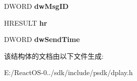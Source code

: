 \begin{DoxyCompactItemize}
\mbox{\label{struct_d_p_m_s_g___s_e_n_d_c_o_m_p_l_e_t_e_a252bc3eaf8a8cf646771c77aefa6409b}} 
D\+W\+O\+RD {\bfseries dw\+Msg\+ID}
\item 
\mbox{\label{struct_d_p_m_s_g___s_e_n_d_c_o_m_p_l_e_t_e_ab48fa50937446b214cd0e41ec237008c}} 
H\+R\+E\+S\+U\+LT {\bfseries hr}
\item 
\mbox{\label{struct_d_p_m_s_g___s_e_n_d_c_o_m_p_l_e_t_e_aeeae925b87fd9d2026eaee60bfdde9c0}} 
D\+W\+O\+RD {\bfseries dw\+Send\+Time}
\end{DoxyCompactItemize}


该结构体的文档由以下文件生成\+:\begin{DoxyCompactItemize}
\item 
E\+:/\+React\+O\+S-\/0../sdk/include/psdk/dplay.\+h\end{DoxyCompactItemize}
